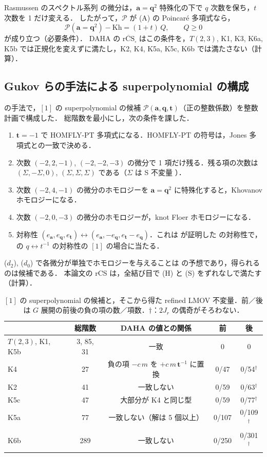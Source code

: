 \documentclass[11pt,a4paper]{ltjsarticle}
\theoremstyle{definition}
\theoremstyle{remark}
\newcommand{\rCS}{\overline{\mathrm{rCS}}}
\newcommand{\ba}{\mathbf{a}}
\newcommand{\bq}{\mathbf{q}}
\newcommand{\bt}{\mathbf{t}}
\begin{document}
Rasmussen のスペクトル系列 \cite{Ras} の微分は，$\ba=\bq^2$ 特殊化の下で $q$ 次数を保ち，$t$ 次数を 1 だけ変える．
したがって，$\mathcal{P}$ が (A) の Poincaré 多項式なら，
\begin{equation}\label{eq:sscond}
\mathcal{P}(\ba=\bq^2)-\mathrm{Kh}=(1+t)\,Q,\qquad Q\ge0
\end{equation}
が成り立つ（必要条件）．
DAHA の $\rCS_\square$ はこの条件を，$T(2,3)$, K1, K3, K6a, K5b では正規化を変えずに満たし，K2, K4, K5a, K5c, K6b では満たさない（計算）．

\subsection{Gukov らの手法による superpolynomial の構成}

\cite{DGR} の手法で，$[1]$ の superpolynomial の候補 $\mathcal{P}(\ba,\bq,\bt)$（正の整数係数）を整数計画で構成した．
総階数を最小にし，次の条件を課した．
\begin{enumerate}
\item[(H)] $\bt=-1$ で HOMFLY-PT 多項式になる．HOMFLY-PT の符号は，Jones 多項式との一致で決める．
\item[($d_{\pm1}$)] 次数 $(-2,2,-1)$, $(-2,-2,-3)$ の微分で 1 項だけ残る．残る項の次数は $(\Sigma,-\Sigma,0)$, $(\Sigma,\Sigma,\Sigma)$ である（$\Sigma$ は S 不変量 \cite{DGR,GGS}）．
\item[($d_2$)] 次数 $(-2,4,-1)$ の微分のホモロジーを $\ba=\bq^2$ に特殊化すると，Khovanov ホモロジーになる．
\item[($d_0$)] 次数 $(-2,0,-3)$ の微分のホモロジーが，knot Floer ホモロジーになる．
\item[(S)] 対称性 $(e_\ba,e_\bq,e_\bt)\leftrightarrow(e_\ba,-e_\bq,e_\bt-e_\bq)$．これは \cite{GHM} が証明した \cite{DGR} の対称性で，\cite{KN} の $q\leftrightarrow t^{-1}$ の対称性の $[1]$ の場合に当たる．
\end{enumerate}
($d_2$), ($d_0$) で各微分が単独でホモロジーを与えることは \cite{DGR} の予想であり，得られるのは候補である．
本論文の rCS は，全結び目で (H) と (S) をずれなしで満たす（計算）．

\begin{table}[h]
\centering
\caption{$[1]$ の superpolynomial の候補と，そこから得た refined LMOV 不変量．前／後は $G$ 展開の前後の負の項の数／項数．$\dagger$：$2J_r$ の偶奇がそろわない．}\label{tab:superpoly}
\small
\begin{tabular}{lcccc}
\toprule
 & 総階数 & DAHA の値との関係 & 前 & 後 \\
\midrule
$T(2,3)$, K1, K5b & 3, 85, 31 & 一致 & 0 & 0 \\
K4 & 27 & 負の項 $-c\,m$ を $+c\,m\,\bt^{-1}$ に置換 & 0/47 & 0/54$^\dagger$ \\
K2 & 41 & 一致しない & 0/59 & 0/63$^\dagger$ \\
K5c & 47 & 大部分が K4 と同じ型 & 0/59 & 0/77$^\dagger$ \\
K5a & 77 & 一致しない（解は 5 個以上） & 0/107 & 0/109$^\dagger$ \\
K6b & 289 & 一致しない & 0/250 & 0/301$^\dagger$ \\
\bottomrule
\end{tabular}
\end{table}
\end{document}

